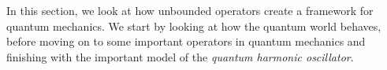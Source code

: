 In this section, we look at how unbounded operators create a framework for quantum mechanics. We start by looking at how the quantum world behaves, before moving on to some important operators in quantum mechanics and finishing with the important model of the {\emph{quantum harmonic oscillator}}.



%
%
%
%
%
